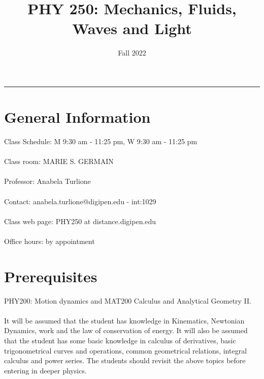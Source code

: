 \documentclass[12pt]{article}
\title{PHY 250: Mechanics, Fluids, Waves and Light}
\author{Fall 2022}
\date{}
\newcommand{\blankline}{\quad\pagebreak[2]}
\begin{document}
\maketitle









\hrule



\section*{General Information }

Class Schedule:  M 9:30 am - 11:25 pm, W 9:30 am - 11:25 pm\\ 
\\
Class room: 	MARIE S. GERMAIN\\
\\
Professor: Anabela Turlione\\
\\
Contact: anabela.turlione@digipen.edu - int:1029\\
\\
Class web page: PHY250 at distance.digipen.edu\\
\\
Office hours: by appointment\\

\section*{Prerequisites }
 PHY200: Motion dynamics and MAT200 Calculus and Analytical Geometry II.\\
\\
It will be assumed that the student has knowledge in Kinematics, Newtonian Dynamics, work and the law of conservation of 
energy.	
It will also be assumed that the student has some basic knowledge in calculus of derivatives, 
basic trigonometrical curves and operations, common geometrical relations, integral calculus and power series. 
The students should revisit the above topics before entering in deeper physics.
\end{document}
